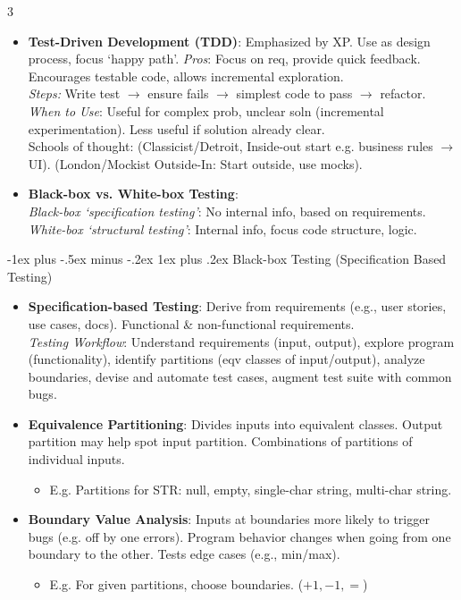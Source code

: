 \documentclass[a4paper, 10pt, landscape]{article}
\makeatletter
\renewcommand{\subsubsection}{\@startsection{subsubsection}{3}{0mm}%
                                {-1ex plus -.5ex minus -.2ex}%
                                {1ex plus .2ex}%
                                {\normalfont\small\bfseries}}
\makeatother
\begin{document}
\begin{multicols*}{3}
\begin{itemize}
    \item \textbf{Test-Driven Development (TDD)}: Emphasized by XP. Use as design process, focus `happy path'. 
    	\textit{Pros}: Focus on req, provide quick feedback. Encourages testable code, allows incremental exploration. 
    	\\ \textit{Steps:} Write test $\rightarrow$ ensure fails $\rightarrow$ simplest code to pass $\rightarrow$ refactor.
	\\ \textit{When to Use}: Useful for complex prob, unclear soln (incremental experimentation). Less useful if solution already clear. \\
	Schools of thought: (Classicist/Detroit, Inside-out start e.g. business rules $\rightarrow$ UI). (London/Mockist Outside-In: Start outside, use mocks).

    \item \textbf{Black-box vs. White-box Testing}: \\
    	\textit{Black-box `specification testing'}: No internal info, based on requirements. \\
    	\textit{White-box `structural testing'}: Internal info, focus code structure, logic.
\end{itemize}

\subsubsection{Black-box Testing (Specification Based Testing)}
\begin{itemize}
    \item \textbf{Specification-based Testing}: Derive from requirements (e.g., user stories, use cases, docs). Functional \& non-functional requirements. \\
	 \textit{Testing Workflow}: Understand requirements (input, output), explore program (functionality), identify partitions (eqv classes of input/output), analyze boundaries, devise and automate test cases, augment test suite with common bugs.
    \item \textbf{Equivalence Partitioning}: Divides inputs into equivalent classes. Output partition may help spot input partition. Combinations of partitions of individual inputs.
    \begin{itemize}
		\item E.g. Partitions for STR: null, empty, single-char string, multi-char string.
	\end{itemize}
    \item \textbf{Boundary Value Analysis}: Inputs at boundaries more likely to trigger bugs (e.g. off by one errors). Program behavior changes when going from one boundary to the other. Tests edge cases (e.g., min/max).
    \begin{itemize}
		\item E.g. For given partitions, choose boundaries. ($+1, -1, =$)
	\end{itemize}
\end{itemize}


\end{multicols*}
\end{document}
